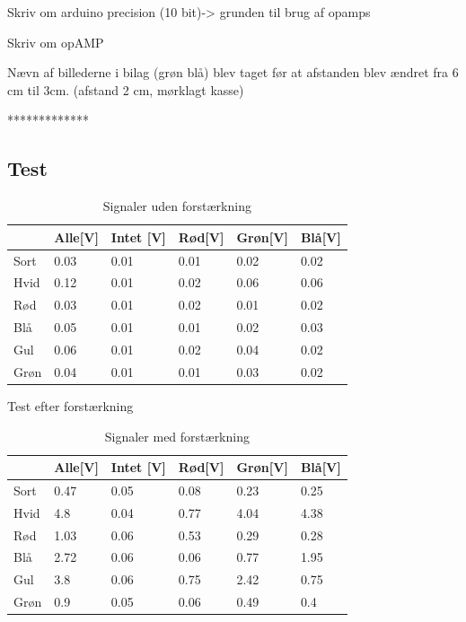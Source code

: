 Skriv om arduino precision (10 bit)-> grunden til brug af opamps

Skriv om opAMP


Nævn af billederne i bilag (grøn blå) blev taget før at afstanden blev ændret fra 6 cm til 3cm.
(afstand 2 cm, mørklagt kasse)

*************
\subsection{Test}


\begin{table}[H]
\centering
\caption{Signaler uden forstærkning} \label{tab:farveudenforstaerker}
\label{my-label}
\begin{tabular}{l|lllll}
\hline \hline
     & Alle{[\si{V}]} & Intet {[\si{V}]} & Rød{[\si{V}]} & Grøn{[\si{V}]} & Blå{[\si{V}]} \\
     \hline
Sort & 0.03        & 0.01          & 0.01       & 0.02        & 0.02       \\
Hvid & 0.12        & 0.01          & 0.02       & 0.06        & 0.06       \\
Rød  & 0.03        & 0.01          & 0.02       & 0.01        & 0.02       \\
Blå  & 0.05        & 0.01          & 0.01       & 0.02        & 0.03       \\
Gul  & 0.06        & 0.01          & 0.02       & 0.04        & 0.02       \\
Grøn & 0.04        & 0.01          & 0.01       & 0.03        & 0.02 \\[1ex]
\hline     
\end{tabular}
\end{table}

Test efter forstærkning
\begin{table}[H]
\centering
\caption{Signaler med forstærkning} \label{tab:farvemedforstaerker}
\begin{tabular}{l|lllll}
\hline\hline
     & Alle{[\si{V}]} & Intet {[\si{V}]} & Rød{[\si{V}]} & Grøn{[\si{V}]} & Blå{[\si{V}]} \\
     \hline
Sort & 0.47        & 0.05          & 0.08       & 0.23        & 0.25       \\
Hvid & 4.8         & 0.04          & 0.77       & 4.04        & 4.38       \\
Rød  & 1.03        & 0.06          & 0.53       & 0.29        & 0.28       \\
Blå  & 2.72        & 0.06          & 0.06       & 0.77        & 1.95       \\
Gul  & 3.8         & 0.06          & 0.75       & 2.42        & 0.75       \\
Grøn & 0.9         & 0.05          & 0.06       & 0.49        & 0.4 \\[1ex]
\hline
\end{tabular}
\end{table}

